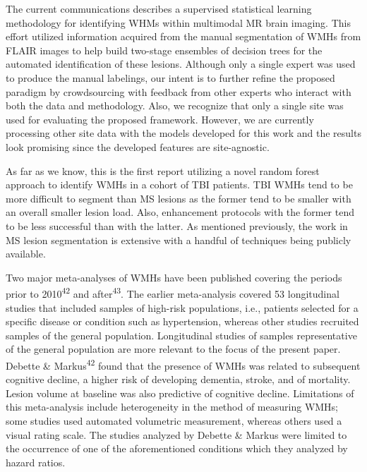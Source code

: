 \documentclass[11pt,]{article}
\begin{document}
The current communications describes a supervised statistical learning
methodology for identifying WHMs within multimodal MR brain imaging.
This effort utilized information acquired from the manual segmentation
of WMHs from FLAIR images to help build two-stage ensembles of decision
trees for the automated identification of these lesions. Although only a
single expert was used to produce the manual labelings, our intent is to
further refine the proposed paradigm by crowdsourcing with feedback from
other experts who interact with both the data and methodology. Also, we
recognize that only a single site was used for evaluating the proposed
framework. However, we are currently processing other site data with the
models developed for this work and the results look promising since the
developed features are site-agnostic.

As far as we know, this is the first report utilizing a novel random
forest approach to identify WMHs in a cohort of TBI patients. TBI WMHs
tend to be more difficult to segment than MS lesions as the former tend
to be smaller with an overall smaller lesion load. Also, enhancement
protocols with the former tend to be less successful than with the
latter. As mentioned previously, the work in MS lesion segmentation is
extensive with a handful of techniques being publicly available.

Two major meta-analyses of WMHs have been published covering the periods
prior to 2010\textsuperscript{42} and after\textsuperscript{43}. The
earlier meta-analysis covered 53 longitudinal studies that included
samples of high-risk populations, i.e., patients selected for a specific
disease or condition such as hypertension, whereas other studies
recruited samples of the general population. Longitudinal studies of
samples representative of the general population are more relevant to
the focus of the present paper. Debette \& Markus\textsuperscript{42}
found that the presence of WMHs was related to subsequent cognitive
decline, a higher risk of developing dementia, stroke, and of mortality.
Lesion volume at baseline was also predictive of cognitive decline.
Limitations of this meta-analysis include heterogeneity in the method of
measuring WMHs; some studies used automated volumetric measurement,
whereas others used a visual rating scale. The studies analyzed by
Debette \& Markus were limited to the occurrence of one of the
aforementioned conditions which they analyzed by hazard ratios.
\end{document}

